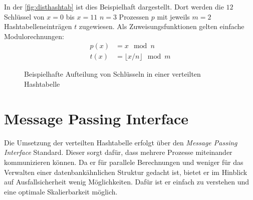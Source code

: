 \documentclass{scrreprt}
\begin{document}
In der \autoref{fig:disthashtab} ist dies Beispielhaft dargestellt. Dort werden die $12$ Schlüssel von $x=0$ bis $x=11$ $n=3$ Prozessen $p$ mit jeweils $m=2$ Hashtabelleneinträgen $t$ zugewiesen. Als Zuweisungsfunktionen gelten einfache Modulorechnungen:
\begin{align*}
p(x)&=x\mod n\\
t(x)&=\lfloor x/n\rfloor\mod m
\end{align*}
\begin{figure}[!ht]
\centering
{}
\caption{Beispielhafte Aufteilung von Schlüsseln in einer verteilten Hashtabelle}
\label{fig:disthashtab}
\end{figure}

\section{Message Passing Interface}
Die Umsetzung der verteilten Hashtabelle erfolgt über den \emph{Message Passing Interface} Standard. Dieser sorgt dafür, dass mehrere Prozesse miteinander kommunizieren können. Da er für parallele Berechnungen und weniger für das Verwalten einer datenbankähnlichen Struktur gedacht ist, bietet er im Hinblick auf Ausfallsicherheit wenig Möglichkeiten. Dafür ist er einfach zu verstehen und eine optimale Skalierbarkeit möglich.
\end{document}
